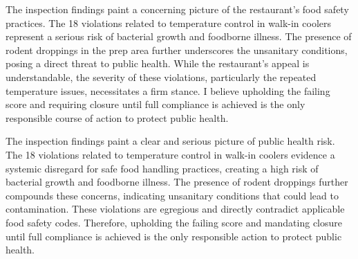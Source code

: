 \item[\normalfont\textit{Oscar Wali, round 1:}] The inspection findings paint a concerning picture of the restaurant's food safety practices. The 18 violations related to temperature control in walk-in coolers represent a serious risk of bacterial growth and foodborne illness. The presence of rodent droppings in the prep area further underscores the unsanitary conditions, posing a direct threat to public health. While the restaurant's appeal is understandable, the severity of these violations, particularly the repeated temperature issues, necessitates a firm stance. I believe upholding the failing score and requiring closure until full compliance is achieved is the only responsible course of action to protect public health.
\item[\normalfont\textit{Thomas Okwu, round 3:}] The inspection findings paint a clear and serious picture of public health risk. The 18 violations related to temperature control in walk-in coolers evidence a systemic disregard for safe food handling practices, creating a high risk of bacterial growth and foodborne illness. The presence of rodent droppings further compounds these concerns, indicating unsanitary conditions that could lead to contamination. These violations are egregious and directly contradict applicable food safety codes. Therefore, upholding the failing score and mandating closure until full compliance is achieved is the only responsible action to protect public health.%
